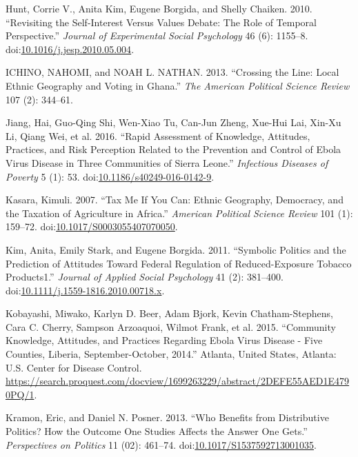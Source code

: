 \documentclass[]{article}
\begin{document}
\hypertarget{ref-hunt_revisiting_2010}{}
Hunt, Corrie V., Anita Kim, Eugene Borgida, and Shelly Chaiken. 2010.
``Revisiting the Self-Interest Versus Values Debate: The Role of
Temporal Perspective.'' \emph{Journal of Experimental Social Psychology}
46 (6): 1155--8.
doi:\href{https://doi.org/10.1016/j.jesp.2010.05.004}{10.1016/j.jesp.2010.05.004}.

\hypertarget{ref-ichino_crossing_2013}{}
ICHINO, NAHOMI, and NOAH L. NATHAN. 2013. ``Crossing the Line: Local
Ethnic Geography and Voting in Ghana.'' \emph{The American Political
Science Review} 107 (2): 344--61.

\hypertarget{ref-jiang_rapid_2016}{}
Jiang, Hai, Guo-Qing Shi, Wen-Xiao Tu, Can-Jun Zheng, Xue-Hui Lai,
Xin-Xu Li, Qiang Wei, et al. 2016. ``Rapid Assessment of Knowledge,
Attitudes, Practices, and Risk Perception Related to the Prevention and
Control of Ebola Virus Disease in Three Communities of Sierra Leone.''
\emph{Infectious Diseases of Poverty} 5 (1): 53.
doi:\href{https://doi.org/10.1186/s40249-016-0142-9}{10.1186/s40249-016-0142-9}.

\hypertarget{ref-kasara_tax_2007}{}
Kasara, Kimuli. 2007. ``Tax Me If You Can: Ethnic Geography, Democracy,
and the Taxation of Agriculture in Africa.'' \emph{American Political
Science Review} 101 (1): 159--72.
doi:\href{https://doi.org/10.1017/S0003055407070050}{10.1017/S0003055407070050}.

\hypertarget{ref-kim_symbolic_2011}{}
Kim, Anita, Emily Stark, and Eugene Borgida. 2011. ``Symbolic Politics
and the Prediction of Attitudes Toward Federal Regulation of
Reduced-Exposure Tobacco Products1.'' \emph{Journal of Applied Social
Psychology} 41 (2): 381--400.
doi:\href{https://doi.org/10.1111/j.1559-1816.2010.00718.x}{10.1111/j.1559-1816.2010.00718.x}.

\hypertarget{ref-kobayashi_community_2015}{}
Kobayashi, Miwako, Karlyn D. Beer, Adam Bjork, Kevin Chatham-Stephens,
Cara C. Cherry, Sampson Arzoaquoi, Wilmot Frank, et al. 2015.
``Community Knowledge, Attitudes, and Practices Regarding Ebola Virus
Disease - Five Counties, Liberia, September-October, 2014.'' Atlanta,
United States, Atlanta: U.S. Center for Disease Control.
\url{https://search.proquest.com/docview/1699263229/abstract/2DEFE55AED1E4790PQ/1}.

\hypertarget{ref-kramon_who_2013}{}
Kramon, Eric, and Daniel N. Posner. 2013. ``Who Benefits from
Distributive Politics? How the Outcome One Studies Affects the Answer
One Gets.'' \emph{Perspectives on Politics} 11 (02): 461--74.
doi:\href{https://doi.org/10.1017/S1537592713001035}{10.1017/S1537592713001035}.
\end{document}
